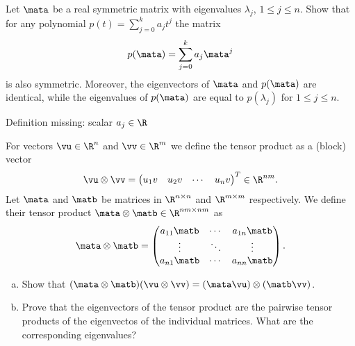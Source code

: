 
\begin{Sheet}
  \label{sheet7}

  \begin{Problem}
    Let $\mata$ be a real symmetric matrix with eigenvalues
    $\lambda_j$, $1\leq j\leq n$. Show that for any polynomial
    $p(t) = \sum_{j=0}^k a_jt^j$
    the matrix
    \begin{gather*}
      p(\mata) = \sum_{j=0}^k a_j\mata^j
    \end{gather*}
    is also symmetric. Moreover, the eigenvectors of $\mata$ and
    $p(\mata)$ are identical, while the eigenvalues of $p(\mata)$ are
    equal to $p(\lambda_j)$ for $1\leq j\leq n$.
    \begin{todo}
      Definition missing: scalar $a_j\in\R$
    \end{todo}
  \end{Problem}

  \begin{Problem}
     \label{sheet7:problem2}

    For vectors $\vu\in\R^n$ and $\vv\in\R^m$ we define the tensor
    product as a (block) vector
    \begin{gather*}
      \vu\otimes\vv =
      \begin{pmatrix}
        u_1v& u_2v& \cdots & u_nv
      \end{pmatrix}^T \in\R^{nm}.
    \end{gather*}
    Let $\mata$ and $\matb$ be matrices in $\R^{n\times n}$ and
    $\R^{m\times m}$ respectively. We define their tensor product
    $\mata\otimes\matb\in\R^{nm\times nm}$ as
    \begin{gather*}
      \mata\otimes\matb =
      \begin{pmatrix}
        a_{11}\matb & \cdots & a_{1n}\matb \\
        \vdots & \ddots & \vdots \\
        a_{n1}\matb & \cdots & a_{nn}\matb
      \end{pmatrix}.
    \end{gather*}
    \begin{enumerate}[(a)]
    \item Show that
      $(\mata\otimes\matb)(\vu\otimes\vv) =
      (\mata\vu)\otimes(\matb\vv)$.
    \item Prove that the eigenvectors of the tensor product are the
      pairwise tensor products of the eigenvectos of the individual
      matrices. What are the corresponding eigenvalues?
    \end{enumerate}
  \end{Problem}


\end{Sheet}

